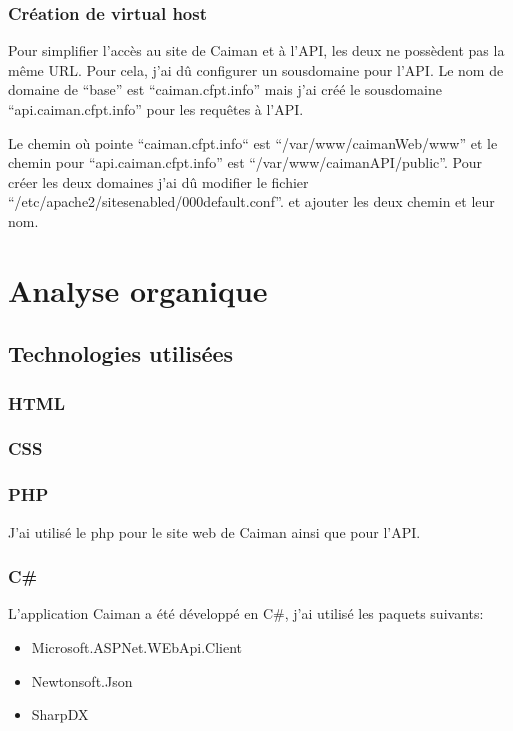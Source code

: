 \documentclass[a4paper,12pt,french]{sphinxmanual}
\begin{document}
\subsection{Création de virtual host}
\label{\detokenize{fonctionnelle:creation-de-virtual-host}}
\sphinxAtStartPar
Pour simplifier l’accès au site de Caiman et à l’API, les deux ne possèdent pas la même URL. Pour cela, j’ai dû configurer un sous\sphinxhyphen{}domaine pour l’API. Le nom de domaine de “base” est “caiman.cfpt.info” mais j’ai créé le sous\sphinxhyphen{}domaine “api.caiman.cfpt.info” pour les requêtes à l’API.

\sphinxAtStartPar
Le chemin où pointe “caiman.cfpt.info“ est “/var/www/caimanWeb/www” et le chemin pour “api.caiman.cfpt.info” est “/var/www/caimanAPI/public”. Pour créer les deux domaines j’ai dû modifier le fichier “/etc/apache2/sites\sphinxhyphen{}enabled/000\sphinxhyphen{}default.conf”. et ajouter les deux chemin et leur nom.


\chapter{Analyse organique}
\label{\detokenize{organique:analyse-organique}}\label{\detokenize{organique::doc}}

\section{Technologies utilisées}
\label{\detokenize{organique:technologies-utilisees}}

\subsection{HTML}
\label{\detokenize{organique:html}}

\subsection{CSS}
\label{\detokenize{organique:css}}

\subsection{PHP}
\label{\detokenize{organique:php}}
\sphinxAtStartPar
J’ai utilisé le php pour le site web de Caiman ainsi que pour l’API.


\subsection{C\#}
\label{\detokenize{organique:c}}
\sphinxAtStartPar
L’application Caiman a été développé en C\#, j’ai utilisé les paquets suivants:
\begin{itemize}
\item {} 
\sphinxAtStartPar
Microsoft.ASPNet.WEbApi.Client

\item {} 
\sphinxAtStartPar
Newtonsoft.Json

\item {} 
\sphinxAtStartPar
SharpDX

\end{itemize}
\end{document}
